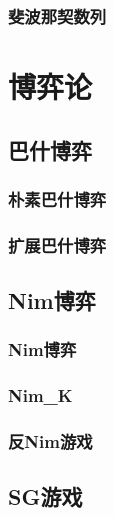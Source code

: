 \documentclass[10pt,a4paper]{article}
\begin{document}
\subsubsection{斐波那契数列}
\begin{spacing}{1.5}

\end{spacing}
\section{博弈论}
\subsection{巴什博弈}
\subsubsection{朴素巴什博弈}
\begin{spacing}{1.5}

\end{spacing}
\subsubsection{扩展巴什博弈}
\begin{spacing}{1.5}

\end{spacing}
\subsection{Nim博弈}
\subsubsection{Nim博弈}
\begin{spacing}{1.5}

\end{spacing}
\subsubsection{Nim\_K}
\begin{spacing}{1.5}

\end{spacing}
\subsubsection{反Nim游戏}
\begin{spacing}{1.5}

\end{spacing}
\subsection{SG游戏}
\end{document}
